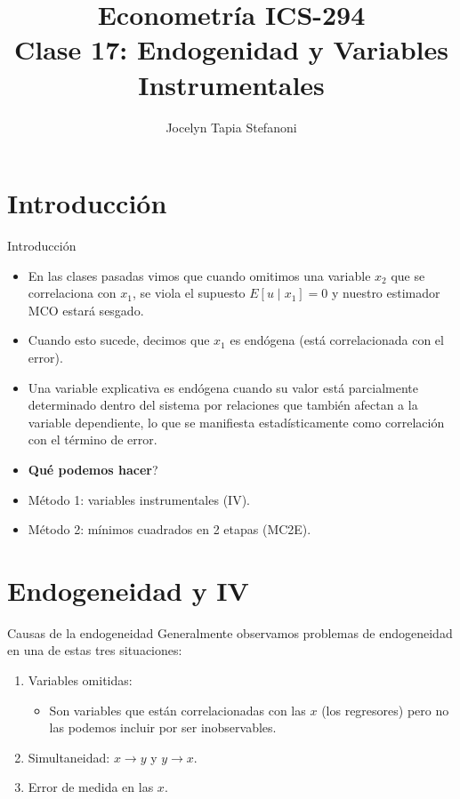 \documentclass[10pt]{beamer}
\title[ICS-162]{Econometr\'ia ICS-294\\ \small{Clase 17: Endogenidad y Variables Instrumentales}}
\author{Jocelyn Tapia Stefanoni}
\institute[USM]
{Universidad T\'ecnica Federico Santa Mar\'ia\\ %
    \medskip
    \textit{} %
    }
\date{}
\begin{document}
\begin{frame}
    \titlepage %
\end{frame}

\section{Introducci\'on}

\begin{frame}{Introducci\'on}
    \begin{itemize}
        \item En las clases pasadas vimos que cuando omitimos una variable $x_{2}$ que se correlaciona con $x_{1}$, se viola el supuesto $E\left[u \mid x_{1}\right]=0$ y nuestro estimador MCO estar\'a sesgado.
        \item Cuando esto sucede, decimos que $x_{1}$ es {\color{blue}end\'ogena (est\'a correlacionada con el error)}.
        \item {\color{blue}Una variable explicativa es endógena cuando su valor está parcialmente determinado dentro del sistema por relaciones que también afectan a la variable dependiente, lo que se manifiesta estadísticamente como correlación con el término de error. }
        \item \textbf{\textquestiondown Qu\'e podemos hacer}?
        \item M\'etodo 1: variables instrumentales (IV).
        \item  M\'etodo 2: mínimos cuadrados en 2 etapas (MC2E).
    \end{itemize}
\end{frame}

\section{Endogeneidad y IV}

\begin{frame}{Causas de la endogeneidad}
    Generalmente observamos problemas de endogeneidad en una de estas tres situaciones:
    \begin{enumerate}
        \item Variables omitidas:
        \begin{itemize}
            \item Son variables que est\'an correlacionadas con las $x$ (los regresores) pero no las podemos incluir por ser inobservables.
        \end{itemize}
        \item Simultaneidad: $x \rightarrow y$ y $y \rightarrow x$.
        \item Error de medida en las $x$.
    \end{enumerate}
\end{frame}
\end{document}

